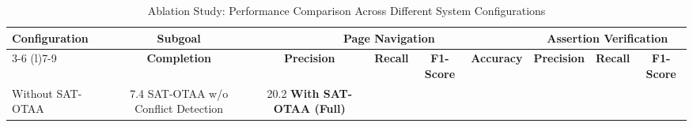
\begin{table}[htbp]
\centering
\caption{Ablation Study: Performance Comparison Across Different System Configurations}
\label{tab:ablation_study}
\begin{tabular}{@{}lcccccccc@{}}
\toprule
\multirow{2}{*}{\textbf{Configuration}} & \multirow{2}{*}{\textbf{Subgoal}} & \multicolumn{4}{c}{\textbf{Page Navigation}} & \multicolumn{3}{c}{\textbf{Assertion Verification}} \\
\cmidrule(lr){3-6} \cmidrule(l){7-9}
& \textbf{Completion} & \textbf{Precision} & \textbf{Recall} & \textbf{F1-Score} & \textbf{Accuracy} & \textbf{Precision} & \textbf{Recall} & \textbf{F1-Score} \\
\midrule
Without SAT-OTAA & 7.4%
SAT-OTAA w/o Conflict Detection & 20.2%
\textbf{With SAT-OTAA (Full)} & \textbf{22.7%
\bottomrule
\end{tabular}
\end{table}